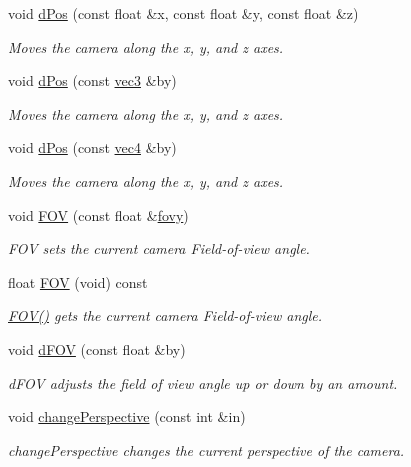 \begin{DoxyCompactItemize}
void \hyperlink{class_camera_a2ac5f89b4f9f012dead66980925143c0}{d\-Pos} (const float \&x, const float \&y, const float \&z)
\begin{DoxyCompactList}\small\item\em \-Moves the camera along the x, y, and z axes. \end{DoxyCompactList}\item 
void \hyperlink{class_camera_a928de59670f0b31264307a8a0888b99d}{d\-Pos} (const \hyperlink{struct_angel_1_1vec3}{vec3} \&by)
\begin{DoxyCompactList}\small\item\em \-Moves the camera along the x, y, and z axes. \end{DoxyCompactList}\item 
void \hyperlink{class_camera_a4ec2e3d2a66826aedb1ac1eee7da0b96}{d\-Pos} (const \hyperlink{struct_angel_1_1vec4}{vec4} \&by)
\begin{DoxyCompactList}\small\item\em \-Moves the camera along the x, y, and z axes. \end{DoxyCompactList}\item 
void \hyperlink{class_camera_ac325bf616014d2e6023b84b6224630ac}{\-F\-O\-V} (const float \&\hyperlink{class_camera_acc8b97facc57059530efad534c2f8314}{fovy})
\begin{DoxyCompactList}\small\item\em \-F\-O\-V sets the current camera \-Field-\/of-\/view angle. \end{DoxyCompactList}\item 
float \hyperlink{class_camera_a8817ea073431268d8c0e522cdc30026c}{\-F\-O\-V} (void) const 
\begin{DoxyCompactList}\small\item\em \hyperlink{class_camera_a8817ea073431268d8c0e522cdc30026c}{\-F\-O\-V()} gets the current camera \-Field-\/of-\/view angle. \end{DoxyCompactList}\item 
void \hyperlink{class_camera_a55355b3376d195b17adcc6a5b72ae07b}{d\-F\-O\-V} (const float \&by)
\begin{DoxyCompactList}\small\item\em d\-F\-O\-V adjusts the field of view angle up or down by an amount. \end{DoxyCompactList}\item 
void \hyperlink{class_camera_ad388a5f75af8f2289447b716c8c839ff}{change\-Perspective} (const int \&in)
\begin{DoxyCompactList}\small\item\em change\-Perspective changes the current perspective of the camera. \end{DoxyCompactList}\item 

\end{DoxyCompactItemize}
